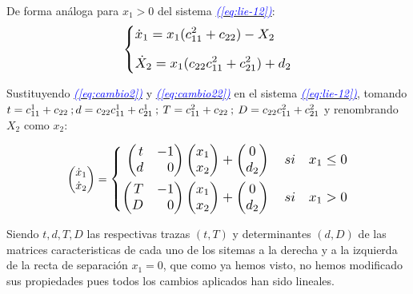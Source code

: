\documentclass[12pt,a4paper]{report} %
\newcommand{\eref}[1]{\hyperref[#1]{\textcolor{blue}{\textit{(\ref*{#1})}}}}
\begin{document}
	De forma análoga para $x_1>0$ del sistema \eref{eq:lie-12}:
	\begin{equation}
		\label{eq:cambio22}
		\scalebox{1.2}{$\displaystyle
			\left\{
			\begin{aligned}
				&\dot{x}_1=x_1(c_{11}^2+c_{22})-X_2 \\[2mm]
				&\dot{X}_2=x_1(c_{22}c_{11}^2+c_{21}^2)+d_2
			\end{aligned}
			\right.
			$}
	\end{equation}\smallskip
	
	Sustituyendo \eref{eq:cambio2} y \eref{eq:cambio22} en el sistema \eref{eq:lie-12}, tomando $t=c_{11}^1+c_{22} \: ; \:\\ d=c_{22}c_{11}^1+c_{21}^1 \: ; \:  T=c_{11}^2+c_{22} \: ; \: D=c_{22}c_{11}^2+c_{21}^2$ y renombrando $X_2$ como $x_2$:
	
	\begin{equation}
		\begin{pmatrix*}[r]
			\dot{x}_1 \\ \dot{x}_2
		\end{pmatrix*}=
		\label{eq:lienard2}
		\scalebox{1.2}{$\displaystyle
			\left\{
			\begin{aligned}
				\begin{pmatrix*}[r]
					t & -1\\
					d & 0
				\end{pmatrix*}\begin{pmatrix*}[r]
				x_1 \\ x_2
				\end{pmatrix*}+\begin{pmatrix}
					0\\d_2
				\end{pmatrix} \quad si \quad x_1\leq 0 \\
				\begin{pmatrix*}[r]
					T & -1\\
					D & 0
				\end{pmatrix*}\begin{pmatrix*}[r]
				x_1 \\ x_2
				\end{pmatrix*}+\begin{pmatrix}
					0\\d_2
				\end{pmatrix} \quad si \quad x_1 > 0
			\end{aligned}
			\right. 
			$}
	\end{equation}\smallskip

	Siendo $t,d,T,D$ las respectivas trazas $(t,T)$ y determinantes $(d,D)$ de las matrices caracteristicas de cada uno de los sitemas a la derecha y a la izquierda de la recta de separación $x_1=0$, que como ya hemos visto, no hemos modificado sus propiedades pues todos los cambios aplicados han sido lineales.\\[0.5cm]
\end{document}
